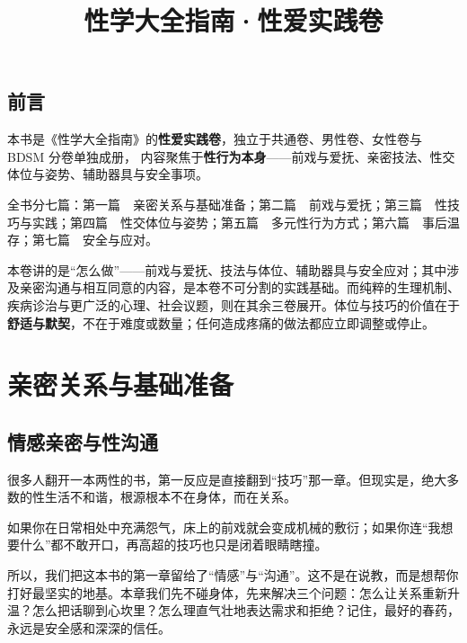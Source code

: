 \documentclass[12pt,UTF8]{ctexbook}
\title{\heiti\zihao{0} 性学大全指南·性爱实践卷}
\author{}
\date{}
\newcommand{\keyword}[1]{\textbf{#1}}
\begin{document}
\maketitle

\frontmatter

\chapter{前言}

本书是《性学大全指南》的\keyword{性爱实践卷}，独立于共通卷、男性卷、女性卷与 BDSM 分卷单独成册，
内容聚焦于\keyword{性行为本身}——前戏与爱抚、亲密技法、性交体位与姿势、辅助器具与安全事项。

全书分七篇：第一篇　亲密关系与基础准备；第二篇　前戏与爱抚；第三篇　性技巧与实践；第四篇　性交体位与姿势；第五篇　多元性行为方式；第六篇　事后温存；第七篇　安全与应对。

\begin{tcolorbox}[colback=pink!5!white,colframe=red!50!black,title=使用说明]
本卷讲的是“怎么做”——前戏与爱抚、技法与体位、辅助器具与安全应对；其中涉及亲密沟通与相互同意的内容，是本卷不可分割的实践基础。而纯粹的生理机制、疾病诊治与更广泛的心理、社会议题，则在其余三卷展开。体位与技巧的价值在于\keyword{舒适与默契}，不在于难度或数量；任何造成疼痛的做法都应立即调整或停止。
\end{tcolorbox}

\tableofcontents

\listoffigures
\listoftables

\mainmatter

\part{亲密关系与基础准备}

\chapter{情感亲密与性沟通}

很多人翻开一本两性的书，第一反应是直接翻到“技巧”那一章。但现实是，绝大多数的性生活不和谐，根源根本不在身体，而在关系。

如果你在日常相处中充满怨气，床上的前戏就会变成机械的敷衍；如果你连“我想要什么”都不敢开口，再高超的技巧也只是闭着眼睛瞎撞。

所以，我们把这本书的第一章留给了“情感”与“沟通”。这不是在说教，而是想帮你打好最坚实的地基。本章我们先不碰身体，先来解决三个问题：怎么让关系重新升温？怎么把话聊到心坎里？怎么理直气壮地表达需求和拒绝？记住，最好的春药，永远是安全感和深深的信任。
\end{document}
